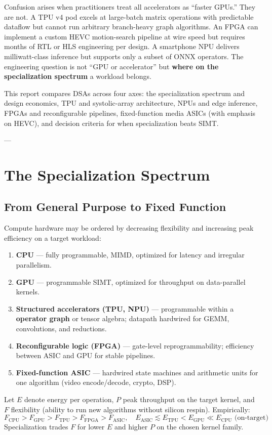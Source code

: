 \documentclass[11pt,journal,onecolumn]{IEEEtran}
\begin{document}
Confusion arises when practitioners treat all accelerators as ``faster GPUs.'' They are not. A TPU v4 pod excels at large-batch matrix operations with predictable dataflow but cannot run arbitrary branch-heavy graph algorithms. An FPGA can implement a custom HEVC motion-search pipeline at wire speed but requires months of RTL or HLS engineering per design. A smartphone NPU delivers milliwatt-class inference but supports only a subset of ONNX operators. The engineering question is not ``GPU or accelerator'' but \textbf{where on the specialization spectrum} a workload belongs.

This report compares DSAs across four axes: the specialization spectrum and design economics, TPU and systolic-array architecture, NPUs and edge inference, FPGAs and reconfigurable pipelines, fixed-function media ASICs (with emphasis on HEVC), and decision criteria for when specialization beats SIMT.

---

\section{The Specialization Spectrum}

\subsection{From General Purpose to Fixed Function}
Compute hardware may be ordered by decreasing flexibility and increasing peak efficiency on a target workload:
\begin{enumerate}
    \item \textbf{CPU} --- fully programmable, MIMD, optimized for latency and irregular parallelism.
    \item \textbf{GPU} --- programmable SIMT, optimized for throughput on data-parallel kernels.
    \item \textbf{Structured accelerators (TPU, NPU)} --- programmable within a \textbf{operator graph} or tensor algebra; datapath hardwired for GEMM, convolutions, and reductions.
    \item \textbf{Reconfigurable logic (FPGA)} --- gate-level reprogrammability; efficiency between ASIC and GPU for stable pipelines.
    \item \textbf{Fixed-function ASIC} --- hardwired state machines and arithmetic units for one algorithm (video encode/decode, crypto, DSP).
\end{enumerate}

Let $E$ denote energy per operation, $P$ peak throughput on the target kernel, and $F$ flexibility (ability to run new algorithms without silicon respin). Empirically:
\begin{equation}
F_{\mathrm{CPU}} > F_{\mathrm{GPU}} > F_{\mathrm{TPU}} > F_{\mathrm{FPGA}} > F_{\mathrm{ASIC}}, \quad
E_{\mathrm{ASIC}} \lesssim E_{\mathrm{TPU}} < E_{\mathrm{GPU}} \ll E_{\mathrm{CPU}} \text{ (on-target)}
\end{equation}
Specialization trades $F$ for lower $E$ and higher $P$ on the chosen kernel family.
\end{document}
